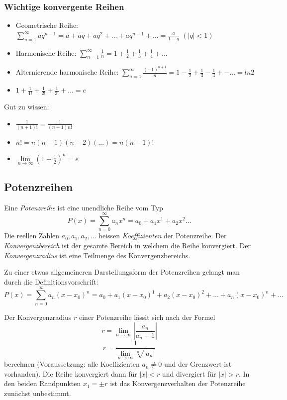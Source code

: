 \subsubsection*{Wichtige konvergente Reihen}
\begin{itemize}
	\item Geometrische Reihe: \\$\sum\limits_{n=1}^{\infty} aq^{n-1} = a + aq + aq^2 + ... + aq^{n-1} + ... = \frac{a}{1-q}$  $(|q| <1)$
	\item Harmonische Reihe: $\sum\limits_{n=1}^{\infty} \frac{1}{n} = 1 + \frac{1}{2} + \frac{1}{3} + \frac{1}{4} + ...$
	\item Alternierende harmonische Reihe: $\sum\limits_{n=1}^{\infty} \frac{(-1)^{n+1}}{n} = 1 - \frac{1}{2} + \frac{1}{3} - \frac{1}{4} + - ... = ln{2}$
	\item $1 + \frac{1}{1!} + \frac{1}{2!}+\frac{1}{3!} + ... = e$
\end{itemize}
Gut zu wissen:
\begin{itemize}
	\item $\frac{1}{(n+1)!} = \frac{1}{(n+1)n!}$
	\item $n! = n(n-1)(n-2)(...) = n(n-1)!$\\
	\item $\lim\limits_{n \rightarrow \infty}(1+\frac{1}{2})^n = e$
\end{itemize}

\subsection{Potenzreihen}
\begin{definition}Eine \textit{Potenzreihe} ist eine unendliche Reihe vom Typ $$P(x)= \sum\limits_{n=0}^{\infty} a_n x^n = a_0 + a_1x^1 + a_2 x^2 ...$$
Die reellen Zahlen $a_0, a_1, a_2, ...$ heissen \textit{Koeffizienten} der Potenzreihe. Der \textit{Konvergenzbereich} ist der gesamte Bereich in welchem die Reihe konvergiert. Der \textit{Konvergenzradius} ist eine Teilmenge des Konvergenzbereichs.
\end{definition}
Zu einer etwas allgemeineren Darstellungsform der Potenzreihen gelangt man durch die Definitionsvorschrift:
$$P(x) = \sum\limits_{n=0}^{\infty} a_n (x-x_0)^n = a_0 + a_1(x-x_0)^1 + a_2(x-x_0)^2 + ... + a_n(x-x_0)^n + ...$$
\begin{formel}
Der Konvergenzradius $r$ einer Potenzreihe lässit sich nach der Formel 
$$r = \lim\limits_{n \rightarrow \infty} \left|\frac{a_n}{a_n+1}\right|$$
$$r = \frac{1}{\lim\limits_{n \rightarrow \infty} \sqrt[n]{\left|a_n\right|}}$$
berechnen (Voraussetzung: alle Koeffizienten $a_n \neq 0$ und der Grenzwert ist vorhanden). Die Reihe konvergiert dann für $|x| < r$ und divergiert für $|x|>r$. In den beiden Randpunkten $x_1 = \pm r$ ist das Konvergenzverhalten der Potenzreihe zunächst unbestimmt.
\end{formel}

